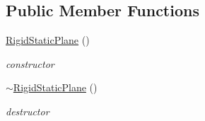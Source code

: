 \subsection*{Public Member Functions}
\begin{DoxyCompactItemize}
\item 
\hypertarget{classContent_1_1Actor_1_1Renderer_1_1RigidStaticPlane_a00bfedfe4d828b0fdda8bacd17565581}{
\hyperlink{classContent_1_1Actor_1_1Renderer_1_1RigidStaticPlane_a00bfedfe4d828b0fdda8bacd17565581}{RigidStaticPlane} ()}
\label{classContent_1_1Actor_1_1Renderer_1_1RigidStaticPlane_a00bfedfe4d828b0fdda8bacd17565581}

\begin{DoxyCompactList}\small\item\em constructor \item\end{DoxyCompactList}\item 
\hypertarget{classContent_1_1Actor_1_1Renderer_1_1RigidStaticPlane_aa83a29ecbc7362d529be88472c360d87}{
\hyperlink{classContent_1_1Actor_1_1Renderer_1_1RigidStaticPlane_aa83a29ecbc7362d529be88472c360d87}{$\sim$RigidStaticPlane} ()}
\label{classContent_1_1Actor_1_1Renderer_1_1RigidStaticPlane_aa83a29ecbc7362d529be88472c360d87}

\begin{DoxyCompactList}\small\item\em destructor \item\end{DoxyCompactList}\end{DoxyCompactItemize}
